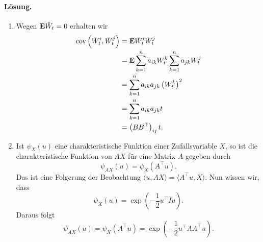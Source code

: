 \paragraph*{Lösung.}
\begin{enumerate}
    \item Wegen $\mathbf{E} \tilde W_t=0$ erhalten wir 
        \begin{align*}
            \operatorname{cov} \left( \tilde W_t^{i}, \tilde W_t^{j} \right) 
            &= \mathbf{E} \tilde W_t^i \tilde W_t^j \\
            &= \mathbf{E} \sum_{k=1}^{n} a_{ik} W_t^k \sum_{k=1}^{n} a_{jk} W_t^j \\
            &= \sum_{k=1}^{n} a_{ik} a_{jk} \left( W_t^k \right)^2 \\
            &= \sum_{k=1}^{n} a_{ik} a_{jk} t \\
            &= \left( B B^\top \right)_{ij} t.
        \end{align*}
    \item Ist $\psi_X(u)$ eine charakteristische Funktion einer Zufallsvariable 
        $X$, so ist die charakteristische Funktion von $AX$ für eine Matrix $A$ gegeben
        durch
        \begin{equation*}
            \psi_{AX}(u) = \psi_{X}(A^\top u). 
        \end{equation*}
        Das ist eine Folgerung der Beobachtung $\langle u, AX \rangle = \langle
        A^\top u, X \rangle$. Nun wissen wir, dass
        \begin{equation*}
            \psi_X(u) = \exp \left( - \frac{1}{2} u^\top I u \right). 
        \end{equation*}
        Daraus folgt
        \begin{equation*}
            \psi_{AX}(u) = \psi_X(A^\top u) = 
            \exp \left( -\frac{1}{2} u^\top AA^\top u \right).
        \end{equation*}
\end{enumerate}


